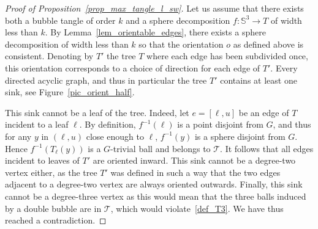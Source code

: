 \documentclass[11pt,a4paper]{article}
\newcommand{\Sp}{\mathbb S}
\newcommand{\T}{\mathcal{T}}
\begin{document}
\begin{proof}[Proof of Proposition~\ref{prop_max_tangle_l_sw}]
  Let us assume that there exists both a bubble tangle of order $k$ and a sphere decomposition $f:\Sp^3 \rightarrow T$ of width less than $k$.
  By Lemma~\ref{lem_orientable_edges}, there exists a sphere decomposition of width less than $k$ so that the orientation $o$ as defined above is consistent. Denoting by $T'$ the tree $T$ where each edge has been subdivided once, this orientation corresponds to a choice of direction for each edge of $T'$. Every directed acyclic graph, and thus in particular the tree $T'$ contains at least one sink, see Figure~\ref{pic_orient_half}. 


  This sink cannot be a leaf of the tree. Indeed, let $e = [\ell,u]$ be an edge of $T$ incident to a leaf $\ell$. By definition, $f^{-1} (\ell)$ is a point disjoint from $G$, and thus for any $y$ in $(\ell, u)$ close enough to $\ell$, $f^{-1} (y)$ is a sphere disjoint from $G$. Hence $f^{-1} (T_\ell(y))$ is a $G$-trivial ball and belongs to $\T$. It follows that all edges incident to leaves of $T'$ are oriented inward. This sink cannot be a degree-two vertex either, as the tree $T'$ was defined in such a way that the two edges adjacent to a degree-two vertex are always oriented outwards. Finally, this sink cannot be a degree-three vertex as this would mean that the three balls induced by a double bubble are in $\T$, which would violate~\ref{def_T3}. We have thus reached a contradiction.\end{proof}
\end{document}

